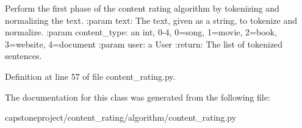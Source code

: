 \begin{DoxyVerb}Perform the first phase of the content rating algorithm by tokenizing and normalizing the text.
:param text: The text, given as a string, to tokenize and normalize.
:param content_type: an int, 0-4, 0=song, 1=movie, 2=book, 3=website, 4=document
:param user: a User
:return: The list of tokenized sentences.
\end{DoxyVerb}
 

Definition at line 57 of file content\+\_\+rating.\+py.



The documentation for this class was generated from the following file\+:\begin{DoxyCompactItemize}
\item 
capstoneproject/content\+\_\+rating/algorithm/content\+\_\+rating.\+py\end{DoxyCompactItemize}
